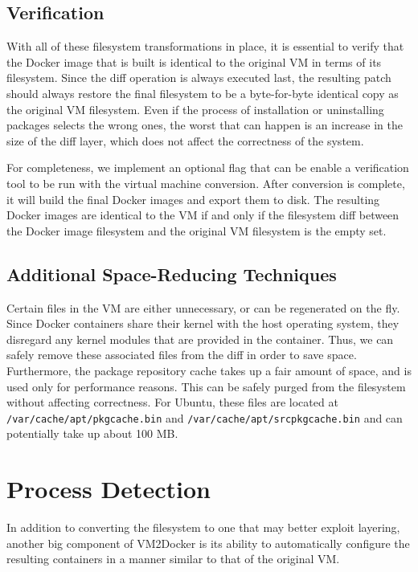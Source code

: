 \subsection{Verification}

With all of these filesystem transformations in place, it is essential to verify that the Docker image that is built is identical to the original VM in terms of its filesystem. Since the diff operation is always executed last, the resulting patch should always restore the final filesystem to be a byte-for-byte identical copy as the original VM filesystem. Even if the process of installation or uninstalling packages selects the wrong ones, the worst that can happen is an increase in the size of the diff layer, which does not affect the correctness of the system.

For completeness, we implement an optional flag that can be enable a verification tool to be run with the virtual machine conversion. After conversion is complete, it will build the final Docker images and export them to disk. The resulting Docker images are identical to the VM if and only if the filesystem diff between the Docker image filesystem and the original VM filesystem is the empty set.

\subsection{Additional Space-Reducing Techniques}
\label{sec:addnltechs}
Certain files in the VM are either unnecessary, or can be regenerated on the fly. Since Docker containers share their kernel with the host operating system, they disregard any kernel modules that are provided in the container. Thus, we can safely remove these associated files from the diff in order to save space. Furthermore, the package repository cache takes up a fair amount of space, and is used only for performance reasons. This can be safely purged from the filesystem without affecting correctness. For Ubuntu, these files are located at \texttt{/var/cache/apt/pkgcache.bin} and \texttt{/var/cache/apt/srcpkgcache.bin} and can potentially take up about 100 MB.

\section{Process Detection}
\label{sec:pdetection}
In addition to converting the filesystem to one that may better exploit layering, another big component of VM2Docker is its ability to automatically configure the resulting containers in a manner similar to that of the original VM.


